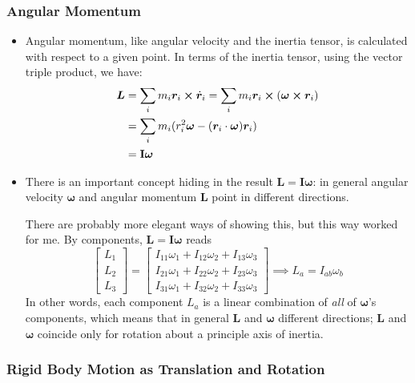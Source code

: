 \documentclass[11pt, a4paper]{article}
\newcommand{\bdot}[1]{\dot{\bm{#1}}}
\newcommand{\mat}[1]{\mathbf{#1}}
\begin{document}
\subsubsection{Angular Momentum}
\begin{itemize}
	\item Angular momentum, like angular velocity and the inertia tensor, is calculated with respect to a given point. In terms of the inertia tensor, using the vector triple product, we have:
	\begin{align*}
		\bm{L} &= \sum_{i} m_{i} \bm{r}_{i} \cross \bdot{r}_{i} = \sum_{i} m_{i} \bm{r}_{i} \cross (\bm{\omega} \cross \bm{r}_{i}) \\
		&= \sum_{i} m_i (r_{i}^2 \bm{\omega} - (\bm{r}_{i} \cdot  \bm{\omega})\bm{r}_{i} )\\
		& = \mathbf{I} \bm{\omega}
	\end{align*}
	
	\item There is an important concept hiding in the result $ \bm{L} = \mat{I} \bm{\omega} $: in general angular velocity $ \bm{\omega} $ and angular momentum $ \bm{L} $ point in different directions. 
	
	There are probably more elegant ways of showing this, but this way worked for me. By components, $  \bm{L} = \mat{I} \bm{\omega} $ reads
	\begin{equation*}
		\begin{bmatrix}
			L_{1}\\
			L_{2}\\
			L_{3}
		\end{bmatrix}
		= 
		\begin{bmatrix}
			I_{11} \omega_{1} + I_{12}\omega_{2} + I_{13}\omega_{3}\\
			I_{21} \omega_{1} + I_{22}\omega_{2} + I_{23}\omega_{3}\\
			I_{31} \omega_{1} + I_{32}\omega_{2} + I_{33}\omega_{3}
		\end{bmatrix} 
		\implies L_{a} = I_{ab} \omega_{b}
	\end{equation*}
	In other words, each component $ L_{a} $ is a linear combination of \textit{all} of $ \bm{\omega} $'s components, which means that in general $ \bm{L} $ and $ \bm{\omega} $  different directions; $ \bm{L} $ and $ \bm{\omega} $ coincide only for rotation about a principle axis of inertia.
	
	
\end{itemize}


\subsubsection{Rigid Body Motion as Translation and Rotation}
\end{document}
